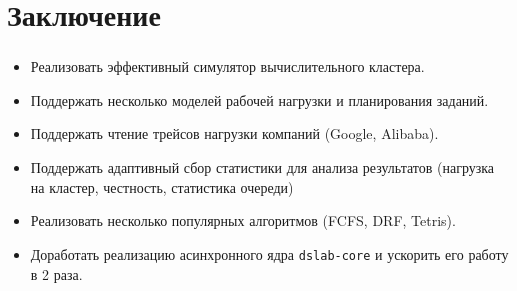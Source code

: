 \documentclass[t]{beamer}  %
\begin{document}
	\section{Заключение}

	\begin{frame}[fragile]
		\frametitle{\insertsection} 
		\framesubtitle{\insertsubsection}
		\small
		\vspace{-0.5cm}
		\hspace*{-0.5cm}
		\begin{minipage}{1.1\linewidth}
			{\centering
		\begin{itemize}
			\item<1->[\ding{51}] Реализовать эффективный симулятор вычислительного кластера.
			\item<2->[\ding{51}] Поддержать несколько моделей рабочей нагрузки и планирования заданий.
			\item<3->[\ding{51}] Поддержать чтение трейсов нагрузки компаний (Google, Alibaba).
			\item<4->[\ding{51}] Поддержать адаптивный сбор статистики для анализа результатов (нагрузка на кластер, честность, статистика очереди)
			\item<5->[\ding{51}] Реализовать несколько популярных алгоритмов (FCFS, DRF, Tetris).
			\item<6->[\ding{51}] Доработать реализацию асинхронного ядра \texttt{dslab-core} и ускорить его работу в 2 раза.
		\end{itemize}
			}
			\vspace{0.2cm}
			
	\end{minipage}

	\end{frame}

\end{document}
